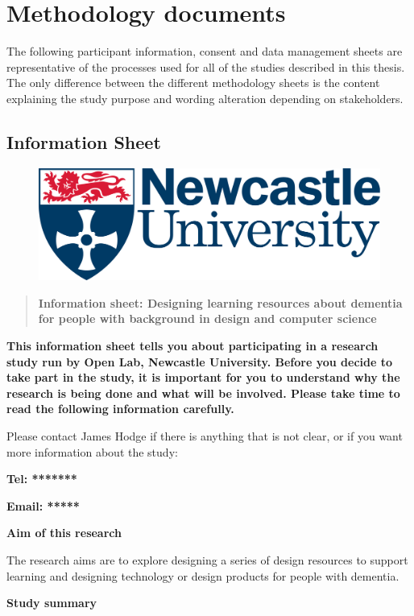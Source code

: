
\chapter{Methodology documents}
The following participant information, consent and data management sheets are representative of the processes used for all of the studies described in this thesis. The only difference between the different methodology sheets is the content explaining the study purpose and wording alteration depending on stakeholders.

\section{Information Sheet}
\label{app:infoSheets}
\begin{figure}[htp]
    \centering
    \includegraphics[width=0.3\linewidth]{Images/logo.png}
\end{figure}
\begin{quote}
\textbf{Information sheet: Designing learning resources about dementia for people with background
in design and computer science}
\end{quote}

\textbf{This information sheet tells you about participating in a research study run by Open Lab, Newcastle University. Before you decide to take part in the study, it is important for you to understand why the research is being done and what will be involved. Please take time to read the following information carefully.
}

Please contact James Hodge if there is anything that is not clear, or if you want more information about the study:

\textbf{Tel: *******}

\textbf{Email: *****}

\textbf{Aim of this research}

The research aims are to explore designing a series of design resources to support learning and designing technology or design products for people with dementia. 

\textbf{Study summary}

